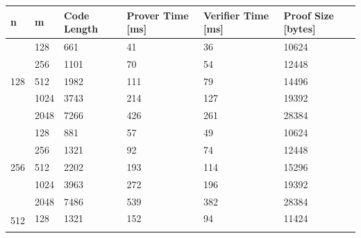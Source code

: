 \begin{table}[h!]
\centering
\begin{tabular}{|c|m{4em}|m{4em}|m{4em}|m{4em}|m{5em}|}
\hline

\multicolumn{1}{|l|}{n}                     & m   & Code Length  & Prover Time {[}ms{]} & Verifier Time {[}ms{]} & Proof Size {[}bytes{]} \\ \hline\hline
\multirow{5}{*}{128}                        & 128 & 661 & 41                   & 36                     & 10624                                         \\ \cline{2-6} 
                                            & 256 & 1101 & 70                  & 54                     & 12448                                         \\ \cline{2-6} 
                                            & 512 & 1982 & 111                  & 79                    & 14496                                         \\ \cline{2-6} 
                                            & 1024 & 3743 & 214                  & 127                    & 19392                                         \\ \cline{2-6} 
                                            & 2048 & 7266 & 426                  & 261                    & 28384                                         \\ \hline
\multirow{5}{*}{256}                        & 128  & 881 & 57                   & 49                     & 10624                                         \\ \cline{2-6} 
                                            & 256  & 1321 & 92                  & 74                    & 12448                                         \\ \cline{2-6} 
                                            & 512  & 2202 & 193                  & 114                    & 15296                                         \\ \cline{2-6} 
                                            & 1024 & 3963 & 272                  & 196                    & 19392                                         \\ \cline{2-6} 
                                            & 2048 & 7486 & 539                  & 382                    & 28384                                         \\ \hline
\multirow{5}{*}{512}                        & 128  & 1321 & 152                  & 94                    & 11424                                         \\ \cline{2-6} 

\end{tabular}
\end{table}
